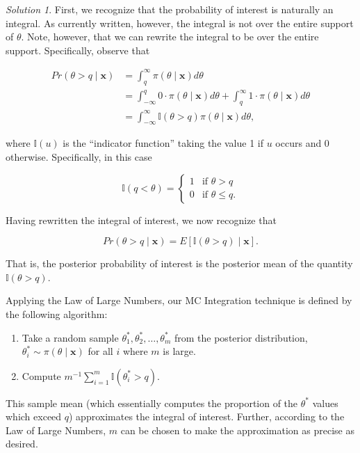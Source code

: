 \documentclass[
  letterpaper,
  DIV=11,
  numbers=noendperiod]{scrreprt}
\providecommand{\tightlist}{%
  \setlength{\itemsep}{0pt}\setlength{\parskip}{0pt}}\usepackage{longtable,booktabs,array}
\theoremstyle{definition}
\theoremstyle{plain}
\theoremstyle{definition}
\theoremstyle{remark}
\newtheorem*{solution}{Solution}
\begin{document}
\begin{solution}

First, we recognize that the probability of interest is naturally an
integral. As currently written, however, the integral is not over the
entire support of \(\theta\). Note, however, that we can rewrite the
integral to be over the entire support. Specifically, observe that

\[
\begin{aligned}
  Pr(\theta > q \mid \mathbf{x})
    &= \int_{q}^{\infty} \pi(\theta \mid \mathbf{x}) d\theta \\
    &= \int_{-\infty}^{q} 0 \cdot \pi(\theta \mid \mathbf{x}) d\theta + \int_{q}^{\infty} 1 \cdot \pi(\theta \mid \mathbf{x}) d\theta \\
    &= \int_{-\infty}^{\infty} \mathbb{I}(\theta > q) \pi(\theta \mid \mathbf{x}) d\theta,
\end{aligned}
\]

where \(\mathbb{I}(u)\) is the ``indicator function'' taking the value 1
if \(u\) occurs and 0 otherwise. Specifically, in this case

\[\mathbb{I}(q < \theta) = \begin{cases} 1 & \text{if } \theta > q \\ 0 & \text{if } \theta \leq q. \end{cases}\]

Having rewritten the integral of interest, we now recognize that

\[Pr(\theta > q \mid \mathbf{x}) = E\left[\mathbb{I}(\theta > q) \mid \mathbf{x}\right].\]

That is, the posterior probability of interest is the posterior mean of
the quantity \(\mathbb{I}(\theta > q)\).

Applying the Law of Large Numbers, our MC Integration technique is
defined by the following algorithm:

\begin{enumerate}
\def\labelenumi{\arabic{enumi}.}
\tightlist
\item
  Take a random sample \(\theta^*_1, \theta^*_2, \dotsc, \theta^*_m\)
  from the posterior distribution,
  \(\theta^*_i \sim \pi(\theta \mid \mathbf{x})\) for all \(i\) where
  \(m\) is large.
\item
  Compute
  \(m^{-1} \sum_{i=1}^{m} \mathbb{I}\left(\theta^*_i > q\right)\).
\end{enumerate}

This sample mean (which essentially computes the proportion of the
\(\theta^*\) values which exceed \(q\)) approximates the integral of
interest. Further, according to the Law of Large Numbers, \(m\) can be
chosen to make the approximation as precise as desired.

\end{solution}
\end{document}

